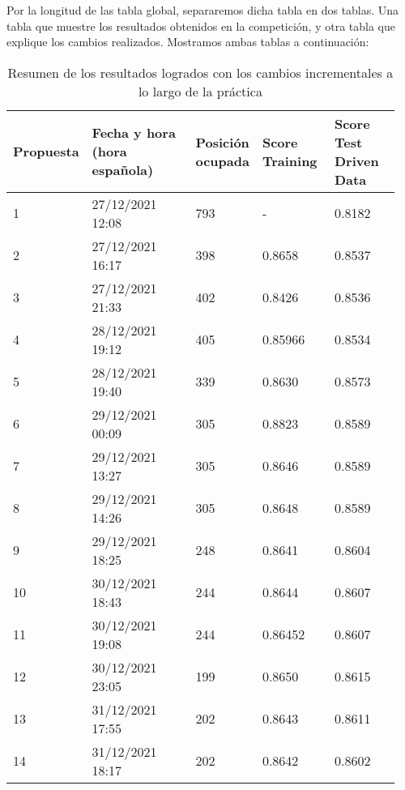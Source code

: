 \documentclass[11pt]{article}
\begin{document}
Por la longitud de las tabla global, separaremos dicha tabla en dos tablas. Una tabla que muestre los resultados obtenidos en la competición, y otra tabla que explique los cambios realizados. Mostramos ambas tablas a continuación:

\begin{table}[H]
\begin{center}
    \begin{tabular}{|p{0.1\linewidth} | p{0.35\linewidth} | p{0.1\linewidth}| p{0.2\linewidth}| p{0.2\linewidth}|}
        \hline
        Propuesta & Fecha y hora (hora española) & Posición ocupada & Score Training & Score Test Driven Data \\

        \hline
        1 & 27/12/2021 12:08 & 793 & - & 0.8182 \\ \hline
        2 & 27/12/2021 16:17 & 398 & 0.8658 & 0.8537 \\ \hline
        3 & 27/12/2021 21:33 & 402 & 0.8426 & 0.8536 \\ \hline
        4 & 28/12/2021 19:12 & 405 & 0.85966 & 0.8534 \\ \hline
        5 & 28/12/2021 19:40 & 339 & 0.8630 & 0.8573 \\ \hline
        6 & 29/12/2021 00:09 & 305 & 0.8823 & 0.8589 \\ \hline
        7 & 29/12/2021 13:27 & 305 & 0.8646 & 0.8589 \\ \hline
        8 & 29/12/2021 14:26 & 305 & 0.8648 & 0.8589 \\ \hline
        9 & 29/12/2021 18:25 & 248 & 0.8641 & 0.8604 \\ \hline
        10 & 30/12/2021 18:43 & 244 & 0.8644 & 0.8607 \\ \hline
        11 & 30/12/2021 19:08 & 244 & 0.86452 & 0.8607 \\ \hline
        12 & 30/12/2021 23:05 & 199 & 0.8650 & 0.8615 \\ \hline
        13 & 31/12/2021 17:55 & 202 & 0.8643 & 0.8611 \\ \hline
        14 & 31/12/2021 18:17 & 202 & 0.8642 & 0.8602 \\ \hline
    \end{tabular}
\end{center}
    \caption{Resumen de los resultados logrados con los cambios incrementales a lo largo de la práctica}
    \label{resumen_resultados:tabla}
\end{table}
\end{document}

